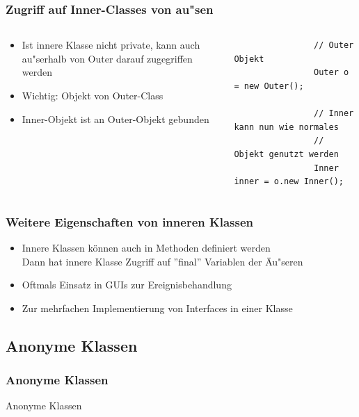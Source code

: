 \begin{frame}[fragile]
	\frametitle{Zugriff auf Inner-Classes von au"sen}
	\begin{columns}
		\begin{column}{0.5\textwidth}
			\small
			\begin{itemize}
			  \item Ist innere Klasse nicht private,
			  kann auch au"serhalb von Outer darauf 
			  zugegriffen werden
			  \item Wichtig: Objekt von Outer-Class
			  \item Inner-Objekt ist an Outer-Objekt
			  gebunden
			\end{itemize}
		\end{column}
		\begin{column}{0.5\textwidth}
			\begin{lstlisting}
				// Outer Objekt
				Outer o = new Outer();
				
				// Inner kann nun wie normales
				// Objekt genutzt werden
				Inner inner = o.new Inner();
			\end{lstlisting}
		\end{column}
	\end{columns}
\end{frame}

\begin{frame}[fragile]
	\frametitle{Weitere Eigenschaften von inneren Klassen}
		\begin{itemize}
		  \item Innere Klassen k\"onnen auch in Methoden
		  definiert werden\\
		  Dann hat innere Klasse Zugriff auf ''final''
		  Variablen der \"Au"seren
		  \item Oftmals Einsatz in GUIs zur Ereignisbehandlung
		  \item Zur mehrfachen Implementierung von Interfaces
		  in einer Klasse
		\end{itemize}
\end{frame}

\subsection{Anonyme Klassen}
\begin{frame}[fragile]
	\frametitle{Anonyme Klassen}
	\huge Anonyme Klassen
\end{frame}

